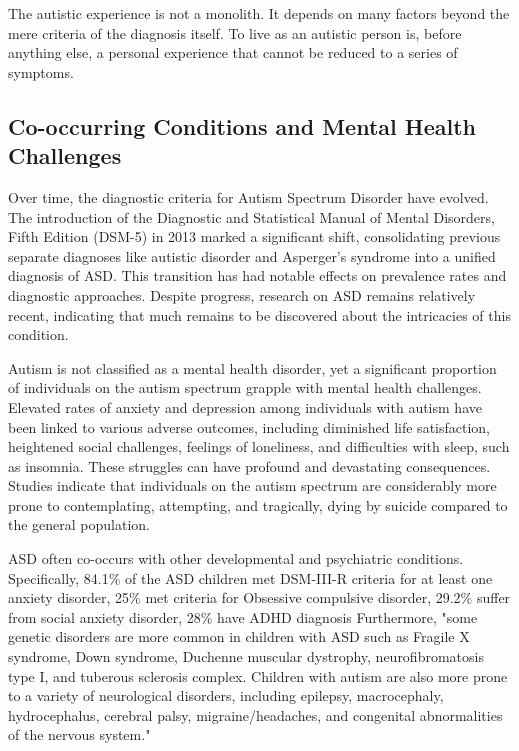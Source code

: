 The autistic experience is not a monolith. It depends on many factors beyond the mere criteria of the diagnosis itself. To live as an autistic person is, before anything else, a personal experience that cannot be reduced to a series of symptoms. 

\subsection{Co-occurring Conditions and Mental Health Challenges}

Over time, the diagnostic criteria for Autism Spectrum Disorder have evolved. The introduction of the Diagnostic and Statistical Manual of Mental Disorders, Fifth Edition (DSM-5) in 2013 marked a significant shift, consolidating previous separate diagnoses like autistic disorder and Asperger's syndrome into a unified diagnosis of ASD. This transition has had notable effects on prevalence rates and diagnostic approaches. Despite progress, research on ASD remains relatively recent, indicating that much remains to be discovered about the intricacies of this condition.

Autism is not classified as a mental health disorder, yet a significant proportion of individuals on the autism spectrum grapple with mental health challenges. Elevated rates of anxiety and depression among individuals with autism have been linked to various adverse outcomes, including diminished life satisfaction, heightened social challenges, feelings of loneliness, and difficulties with sleep, such as insomnia. These struggles can have profound and devastating consequences. Studies indicate that individuals on the autism spectrum are considerably more prone to contemplating, attempting, and tragically, dying by suicide compared to the general population.

ASD often co-occurs with other developmental and psychiatric conditions.
Specifically, 84.1\% of the ASD children met DSM-III-R criteria for at least one anxiety disorder, 25\% met criteria for Obsessive compulsive disorder\cite{2009AnxietyChildrenAdolescents}, 29.2\% suffer from social anxiety disorder, 28\% have ADHD diagnosis\cite{2008PsychiatricDisordersChildren} Furthermore, "some genetic disorders are more common in children with ASD such as Fragile X syndrome, Down syndrome, Duchenne muscular dystrophy, neurofibromatosis type I, and tuberous sclerosis complex. Children with autism are also more prone to a variety of neurological disorders, including epilepsy, macrocephaly, hydrocephalus, cerebral palsy, migraine/headaches, and congenital abnormalities of the nervous system."\cite{2021AutismMedicalComorbidities}


